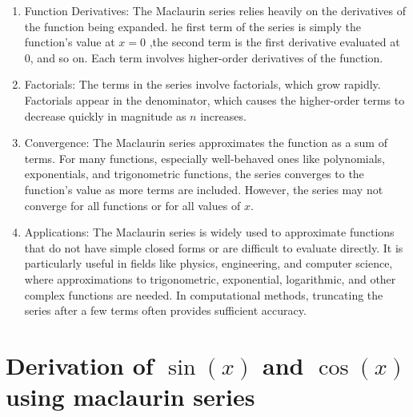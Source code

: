 \documentclass[11pt,a4paper]{article}
\begin{document}
\begin{enumerate}
\item Function Derivatives: The Maclaurin series relies heavily on the derivatives of the function being expanded. he first term of the series is simply the function's value at $x=0$ ,the second term is the first derivative evaluated at 0, and so on. Each term involves higher-order derivatives of the function.
\item Factorials: The terms in the series involve factorials, which grow rapidly. Factorials appear in the denominator, which causes the higher-order terms to decrease quickly in magnitude as $n$ increases.
\item Convergence: The Maclaurin series approximates the function as a sum of terms. For many functions, especially well-behaved ones like polynomials, exponentials, and trigonometric functions, the series converges to the function's value as more terms are included. However, the series may not converge for all functions or for all values of $x$.
\item Applications: The Maclaurin series is widely used to approximate functions that do not have simple closed forms or are difficult to evaluate directly. It is particularly useful in fields like physics, engineering, and computer science, where approximations to trigonometric, exponential, logarithmic, and other complex functions are needed. In computational methods, truncating the series after a few terms often provides sufficient accuracy.
\end{enumerate}
\section{Derivation of $\sin(x)$
and $\cos(x)$ using maclaurin series}
\end{document}
